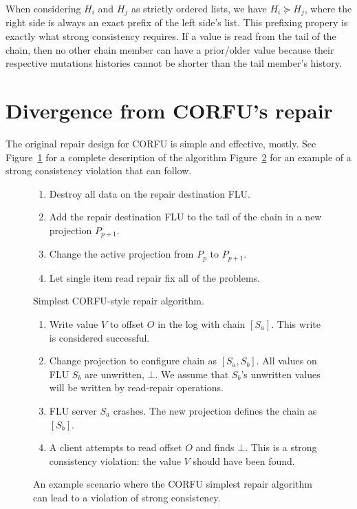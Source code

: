 \documentclass[preprint,10pt]{sigplanconf}
\begin{document}
When considering $H_i$ and $H_j$ as strictly ordered lists, we have 
$H_i \succeq H_j$, where the right side is always an exact prefix of the left
side's list.  This prefixing propery is exactly what strong
consistency requires.  If a value is read from the tail of the chain,
then no other chain member can have a prior/older value because their
respective mutations histories cannot be shorter than the tail
member's history.

\section{Divergence from CORFU's repair}
\label{sub:repair-divergence}

The original repair design for CORFU is simple and effective,
mostly.  See Figure~\ref{fig:corfu-style-repair} for a complete
description of the algorithm
Figure~\ref{fig:corfu-repair-sc-violation} for an example of a strong
consistency violation that can follow.

\begin{figure}
\begin{enumerate}
\item Destroy all data on the repair destination FLU.
\item Add the repair destination FLU to the tail of the chain in a new
  projection $P_{p+1}$.
\item Change the active projection from $P_p$ to $P_{p+1}$.
\item Let single item read repair fix all of the problems.
\end{enumerate}
\caption{Simplest CORFU-style repair algorithm.}
\label{fig:corfu-style-repair}
\end{figure}

\begin{figure}
\begin{enumerate}
\item Write value $V$ to offset $O$ in the log with chain $[S_a]$.
  This write is considered successful.
\item Change projection to configure chain as $[S_a,S_b]$.
  All values on FLU $S_b$ are unwritten, $\bot$.  We assume that
  $S_b$'s unwritten values will be written by read-repair operations.
\item FLU server $S_a$ crashes.  The new projection defines the chain
  as $[S_b]$.
\item A client attempts to read offset $O$ and finds $\bot$.
  This is a strong consistency violation: the value $V$ should have
  been found.
\end{enumerate}
\caption{An example scenario where the CORFU simplest repair algorithm
  can lead to a violation of strong consistency.}
\label{fig:corfu-repair-sc-violation}
\end{figure}
\end{document}
